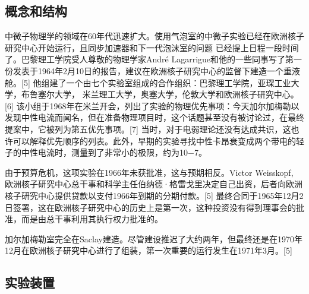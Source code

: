 \subsection{概念和结构}

中微子物理学的领域在60年代迅速扩大。使用气泡室的中微子实验已经在欧洲核子研究中心开始运行，且同步加速器和下一代泡沫室的问题 已经提上日程一段时间了。巴黎理工学院受人尊敬的物理学家André Lagarrigue和他的一些同事写了第一份发表于1964年2月10日的报告，建议在欧洲核子研究中心的监督下建造一个重液舱。[5] 他组建了一个由七个实验室组成的合作组织：巴黎理工学院，亚琛工业大学，布鲁塞尔大学， 米兰理工大学，奥塞大学，伦敦大学和欧洲核子研究中心。[6] 该小组于1968年在米兰开会，列出了实验的物理优先事项：今天加尔加梅勒以发现中性电流而闻名，但在准备物理项目时，这个话题甚至没有被讨论过，在最终提案中，它被列为第五优先事项。[7] 当时，对于电弱理论还没有达成共识，这也许可以解释优先顺序的列表。此外，早期的实验寻找中性卡昂衰变成两个带电的轻子的中性电流时，测量到了非常小的极限，约为10−7。

由于预算危机，这项实验在1966年未获批准，这与预期相反。Victor Weisskopf, 欧洲核子研究中心总干事和科学主任伯纳德·格雷戈里决定自己出资，后者向欧洲核子研究中心提供贷款以支付1966年到期的分期付款。[5] 最终合同于1965年12月2日签署，这在欧洲核子研究中心的历史上是第一次，这种投资没有得到理事会的批准，而是由总干事利用其执行权力批准的。

加尔加梅勒室完全在Saclay建造。尽管建设推迟了大约两年，但最终还是在1970年12月在欧洲核子研究中心进行了组装，第一次重要的运行发生在1971年3月。[5]

\subsection{实验装置}
